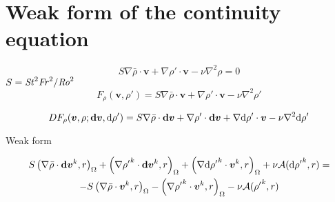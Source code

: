 \section{Weak form of the continuity equation}

\begin{equation}
	S\nabla\bar{\rho}\cdot\bm{v}+\nabla\rho'\cdot\bm{v}-\nu\nabla^2\rho=0
\end{equation}
$S=\mathit{St}^2\mathit{Fr}^2/\mathit{Ro}^2$
\begin{equation}
	F_\rho(\bm{v},\rho')=S\nabla\bar{\rho}\cdot\bm{v}+\nabla\rho'\cdot\bm{v}-\nu\nabla^2\rho'
\end{equation}

\begin{equation}
	DF_\rho(\bm{v},\rho;\bm{\mathrm{d}v},\mathrm{d}\rho')=S\nabla\bar{\rho}\cdot\bm{\mathrm{d}v}+\nabla\rho'\cdot\bm{\mathrm{d}v}+\nabla\mathrm{d}\rho'\cdot\bm{v}-\nu\nabla^2\mathrm{d}\rho'
\end{equation}

Weak form

\begin{multline}
	S\left(\nabla\bar{\rho}\cdot\bm{\mathrm{d}v}^k, r\right)_{\Omega}+\left(\nabla{\rho'}^k\cdot\bm{\mathrm{d}v}^k, r\right)_{\Omega}+\left(\nabla{\ensuremath{\mathrm{d}\rho'} }^k\cdot\bm{v}^k, r\right)_{\Omega}+\nu\mathcal{A}({\mathrm{d}\rho'}^k, r)=\\
	-S\left(\nabla\bar{\rho}\cdot\bm{v}^k, r\right)_{\Omega}-\left(\nabla{\rho'}^k\cdot\bm{v}^k, r\right)_{\Omega}-\nu\mathcal{A}({\rho'}^k, r)
\end{multline}



